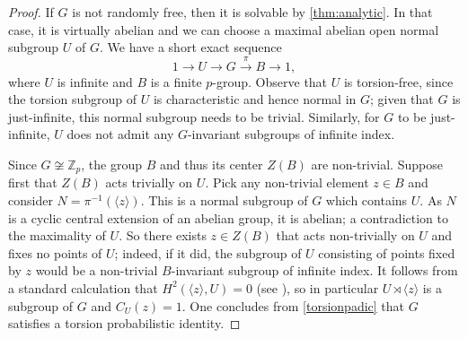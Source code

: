 \documentclass[a4paper,10pt]{amsart}
\theoremstyle{plain}
\theoremstyle{definition}
\newcommand{\bbZ}{\mathbb{Z}}
\numberwithin{equation}{section}
\begin{document}
\begin{proof}
    If $G$ is not randomly free, then it is solvable by \cref{thm:analytic}. In that case, it is virtually abelian and we can choose a maximal abelian open normal subgroup $U$ of $G$.
    We have a short exact sequence
    \[1 \rightarrow U \rightarrow G \xrightarrow \pi B \rightarrow 1,\]
    where $U$ is infinite and $B$ is a finite $p$-group. 
    Observe that $U$ is torsion-free, since the torsion subgroup of $U$ is characteristic and hence normal in $G$; given that $G$ is just-infinite, this normal subgroup needs to be trivial. Similarly, for $G$ to be just-infinite, $U$ does not admit any $G$-invariant subgroups of infinite index.
    
    Since $G \not \cong \bbZ_p$, the group $B$ and thus its center $Z(B)$ are non-trivial. 
    Suppose first that $Z(B)$ acts trivially on $U$. Pick any non-trivial element $z \in B$ and consider $N=\pi^{-1}(\langle z \rangle)$. This is a normal subgroup of $G$ which contains $U$. As $N$ is a cyclic central extension of an abelian group, it is abelian; a contradiction to the maximality of $U$.
    So there exists $z \in Z(B)$ that acts non-trivially on $U$ and fixes no points of $U$; indeed, if it did, the subgroup of $U$ consisting of points fixed by $z$ would be a non-trivial $B$-invariant subgroup of infinite index. It follows from a standard calculation that $H^2(\langle z \rangle,U) = 0$ (see \cite[Theorem 6.2.2]{Weibel}), so in particular $U\rtimes \langle z \rangle$ is a subgroup of $G$ and $C_U(z)=1$. One concludes from \cref{torsionpadic} that $G$ satisfies a torsion probabilistic identity.
\end{proof}




%
%
\end{document}
